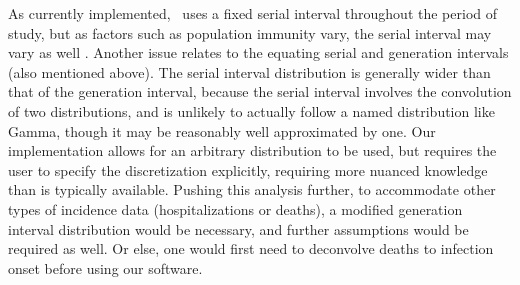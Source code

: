 As currently implemented, \RtEstim\ uses a fixed serial interval throughout the
period of study, but as factors such as population immunity vary, the serial
interval may vary as well \citep{nash2023estimating}.  
Another issue relates to the equating serial and generation intervals (also
mentioned above). The serial interval distribution is generally
wider than that of the generation interval, because the serial interval
involves the convolution of two distributions, and is unlikely to actually
follow a named distribution like Gamma, though it may be reasonably well
approximated by one. Our implementation allows for an arbitrary distribution to
be used, but requires the user to specify the discretization explicitly,
requiring more nuanced knowledge than is typically available.
Pushing this analysis further, to accommodate other types of incidence data
(hospitalizations or deaths), a modified generation interval distribution would be
necessary, and further assumptions would be required as well. Or else, one would
first need to deconvolve deaths to infection onset before using our software.




